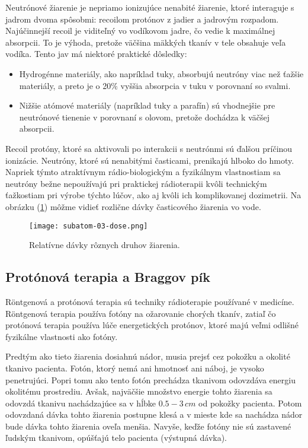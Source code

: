 \documentclass[../../main.tex]{subfiles}
\begin{document}
Neutrónové žiarenie je nepriamo ionizujúce nenabité žiarenie, ktoré interaguje s jadrom dvoma spôsobmi: recoilom protónov z jadier a jadrovým rozpadom. Najúčinnejší recoil je viditeľný vo vodíkovom jadre, čo vedie k maximálnej absorpcii. To je výhoda, pretože väčšina mäkkých tkanív v tele obsahuje veľa vodíka. Tento jav má niektoré praktické dôsledky:
\begin{itemize}
\item Hydrogénne materiály, ako napríklad tuky, absorbujú neutróny viac než ťažšie materiály, a preto je o 20$\%$ vyššia absorpcia v tuku v porovnaní so svalmi.
\item Nižšie atómové materiály (napríklad tuky a parafín) sú vhodnejšie pre neutrónové tienenie v porovnaní s olovom, pretože dochádza k väčšej absorpcii.
\end{itemize}
Recoil protóny, ktoré sa aktivovali po interakcii s neutrónmi sú ďalšou príčinou ionizácie. Neutróny, ktoré sú nenabitými časticami, prenikajú hlboko do hmoty. Napriek týmto atraktívnym rádio-biologickým a fyzikálnym vlastnostiam sa neutróny bežne nepoužívajú pri praktickej rádioterapii kvôli technickým ťažkostiam pri výrobe týchto lúčov, ako aj kvôli ich komplikovanej dozimetrii. Na obrázku (\ref{sf3:fig:dose}) môžme vidieť rozlične dávky časticového žiarenia vo vode.

\begin{figure}[!h]
\texttt{[image: subatom-03-dose.png]}
\centering
\caption{Relatívne dávky rôznych druhov žiarenia.}
\label{sf3:fig:dose}
\end{figure}

\subsection{Protónová terapia a Braggov pík}
Röntgenová a protónová terapia sú techniky rádioterapie používané v medicíne. Röntgenová terapia používa fotóny na ožarovanie chorých tkanív, zatiaľ čo protónová terapia používa lúče energetických protónov, ktoré majú veľmi odlišné fyzikálne vlastnosti ako fotóny.

Predtým ako tieto žiarenia dosiahnú nádor, musia prejsť cez pokožku a okolité tkanivo pacienta. Fotón, ktorý nemá ani hmotnosť ani náboj, je vysoko penetrujúci. Popri tomu ako tento fotón prechádza tkanivom odovzdáva energiu okolitému prostrediu. Avšak, najväčšie množstvo energie tohto žiarenia sa odovzdá tkanivu nachádzajúce sa v hĺbke $0.5-3\,cm$ od pokožky pacienta. Potom odovzdaná dávka tohto žiarenia postupne klesá a v mieste kde sa nachádza nádor bude dávka tohto žiarenia oveľa menšia. Navyše, keďže fotóny nie sú zastavené ľudským tkanivom, opúšťajú telo pacienta (výstupná dávka).
\end{document}
